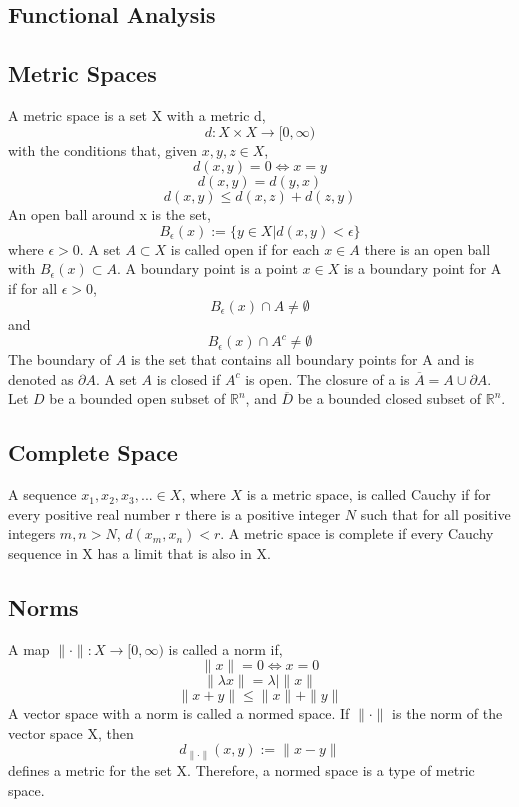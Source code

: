 \documentclass[12pt]{article}
\begin{document}
\begin{flushleft}
\section{Functional Analysis}

\subsection{Metric Spaces}

A metric space is a set X with a metric d,
$$d:X\times X \rightarrow [0,\infty)$$
with the conditions that, given $x,y,z\in X$,
$$d(x,y)=0 \Leftrightarrow x=y$$
$$d(x,y) = d(y,x)$$
$$d(x,y) \leq d(x,z)+d(z,y)$$
An open ball around x is the set,
$$B_\epsilon(x) := \{y\in X |  d(x,y)<\epsilon\}$$
where $\epsilon > 0$. A set $A\subset X$ is called open if for each $x\in A$ there is an open ball with $B_\epsilon(x)\subset A$. A boundary point is a point $x\in X$ is a boundary point for A if for all $\epsilon>0$, $$B_\epsilon(x)\cap A \neq \emptyset$$ 
and 
$$B_\epsilon(x)\cap A^c \neq \emptyset$$
The boundary of $A$ is the set that contains all boundary points for A and is denoted as $\partial A$. A set $A$ is closed if $A^c$ is open. The closure of a is $\overline{A} = A \cup \partial A$. Let $D$ be a bounded open subset of $\mathbb{R}^n$, and $\overline{D}$ be a bounded closed subset of $\mathbb{R}^n$. 

\subsection{Complete Space}

\qquad A sequence $x_1,x_2,x_3,...\in X$, where $X$ is a metric space, is called Cauchy if for every positive real number r there is a positive integer $N$ such that for all positive integers $m,n>N$, $d(x_m,x_n)<r$. A metric space is complete if every Cauchy sequence in X has a limit that is also in X.

\subsection{Norms}

A map $\|\cdot\|: X\rightarrow [0,\infty)$ is called a norm if,
$$\|x\| = 0 \Leftrightarrow x=0$$
$$\|\lambda x\| = \lambda| \|x\|$$
$$\|x+y\| \leq \|x\| + \|y\|$$
A vector space with a norm is called a normed space. If $\|\cdot \|$ is the norm of the vector space X, then 
$$d_{\|\cdot\|}(x,y) := \|x-y\|$$
defines a metric for the set X. Therefore, a normed space is a type of metric space.


\end{flushleft}
\end{document}
